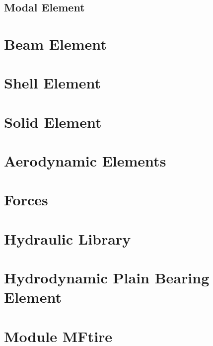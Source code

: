 \documentclass[10pt,fleqn,subeqn]{report}
\begin{document}








\section{Modal Element}




\chapter{Beam Element}




\chapter{Shell Element}


\chapter{Solid Element}


\chapter{Aerodynamic Elements}





\chapter{Forces}




\chapter{Hydraulic Library}


\chapter{Hydrodynamic Plain Bearing Element}


\chapter{Module MFtire}

\end{document}
